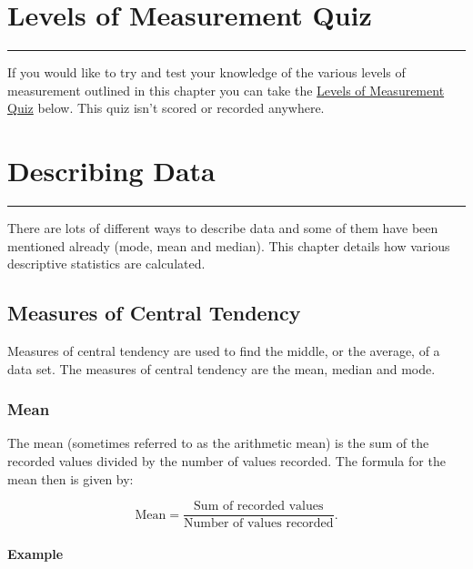 \documentclass[
]{book}
\begin{document}
\hypertarget{quizone}{%
\chapter{Levels of Measurement Quiz}\label{quizone}}

\begin{center}\rule{0.5\linewidth}{0.5pt}\end{center}

If you would like to try and test your knowledge of the various levels of measurement outlined in this chapter you can take the \href{https://view.genial.ly/62867083cd8fd700184ca06f/presentation-quiz}{Levels of Measurement Quiz} below. This quiz isn't scored or recorded anywhere.

\hypertarget{descdata}{%
\chapter{Describing Data}\label{descdata}}

\begin{center}\rule{0.5\linewidth}{0.5pt}\end{center}

There are lots of different ways to describe data and some of them have been mentioned already (mode, mean and median). This chapter details how various descriptive statistics are calculated.

\hypertarget{measures-of-central-tendency}{%
\section{Measures of Central Tendency}\label{measures-of-central-tendency}}

Measures of central tendency are used to find the middle, or the average, of a data set. The measures of central tendency are the mean, median and mode.

\hypertarget{mean}{%
\subsection{Mean}\label{mean}}

The mean (sometimes referred to as the arithmetic mean) is the sum of the recorded values divided by the number of values recorded. The formula for the mean then is given by:

\[ \textrm{Mean} = \frac{\textrm{Sum of recorded values}}{\textrm{Number of values recorded}}.\]

\hypertarget{firstexamp}{%
\subsubsection{Example}\label{firstexamp}}
\end{document}
